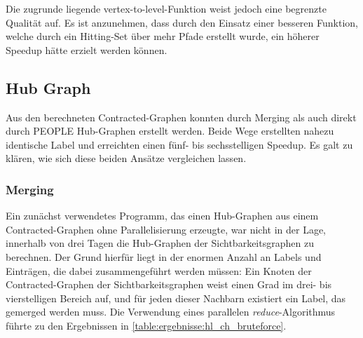 Die zugrunde liegende vertex-to-level-Funktion weist jedoch eine begrenzte Qualität auf.
Es ist anzunehmen, dass durch den Einsatz einer besseren Funktion, welche durch ein Hitting-Set über mehr Pfade erstellt wurde, ein höherer Speedup hätte erzielt werden können.

\subsection{Hub Graph}

Aus den berechneten Contracted-Graphen konnten durch Merging als auch direkt durch PEOPLE Hub-Graphen erstellt werden.
Beide Wege erstellten nahezu identische Label und erreichten einen fünf- bis sechsstelligen Speedup.
Es galt zu klären, wie sich diese beiden Ansätze vergleichen lassen.

\subsubsection{Merging}

Ein zunächst verwendetes Programm, das einen Hub-Graphen aus einem Contracted-Graphen ohne Parallelisierung erzeugte, war nicht in der Lage, innerhalb von drei Tagen die Hub-Graphen der Sichtbarkeitsgraphen zu berechnen.
Der Grund hierfür liegt in der enormen Anzahl an Labels und Einträgen, die dabei zusammengeführt werden müssen: Ein Knoten der Contracted-Graphen der Sichtbarkeitsgraphen weist einen Grad im drei- bis vierstelligen Bereich auf, und für jeden dieser Nachbarn existiert ein Label, das gemerged werden muss.
Die Verwendung eines parallelen \emph{reduce}-Algorithmus führte zu den Ergebnissen in \autoref{table:ergebnisse:hl_ch_bruteforce}.

